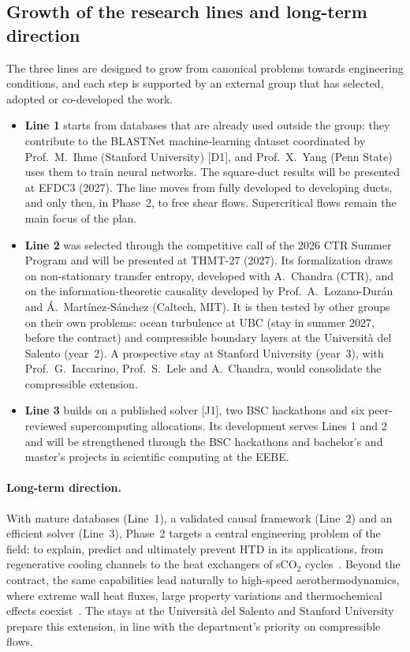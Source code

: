 \documentclass[11pt]{article}
\begin{document}
\subsection{Growth of the research lines and long-term direction}\label{sec:growth}
The three lines are designed to grow from canonical problems towards engineering conditions,
and each step is supported by an external group that has selected, adopted or co-developed
the work.
\begin{itemize}
  \item \textbf{Line 1} starts from databases that are already used outside the group: they
  contribute to the BLASTNet machine-learning dataset coordinated by Prof.\ M.\ Ihme
  (Stanford University) [D1], and Prof.\ X.\ Yang (Penn State) uses them to train neural
  networks. The square-duct results will be presented at EFDC3 (2027). The line moves from
  fully developed to developing ducts, and only then, in Phase~2, to free shear flows.
  Supercritical flows remain the main focus of the plan.
  \item \textbf{Line 2} was selected through the competitive call of the 2026 CTR Summer
  Program and will be presented at THMT-27 (2027). Its formalization draws on non-stationary
  transfer entropy, developed with A.\ Chandra (CTR), and on the information-theoretic
  causality developed by Prof.\ A.\ Lozano-Dur\'an and \'A.\ Mart\'inez-S\'anchez
  (Caltech, MIT). It is then tested by other groups on their own problems: ocean turbulence
  at UBC (stay in summer 2027, before the contract) and compressible boundary layers at the
  Universit\`a del Salento (year~2). A prospective stay at Stanford University (year~3), with
  Prof.\ G.\ Iaccarino, Prof.\ S.\ Lele and A.\ Chandra, would consolidate the compressible
  extension.
  \item \textbf{Line 3} builds on a published solver [J1], two BSC hackathons and six
  peer-reviewed supercomputing allocations. Its development serves Lines 1 and 2 and will
  be strengthened through the BSC hackathons and bachelor's and master's projects in
  scientific computing at the EEBE.
\end{itemize}

\paragraph{Long-term direction.} With mature databases (Line~1), a validated causal framework
(Line~2) and an efficient solver (Line~3), Phase~2 targets a central engineering problem of
the field: to explain, predict and ultimately prevent HTD in its applications, from
regenerative cooling channels to the heat exchangers of sCO$_2$
cycles~\cite{Pizzarelli2018,Ahn2015}. Beyond the contract, the same capabilities lead
naturally to high-speed aerothermodynamics, where extreme wall heat fluxes, large property
variations and thermochemical effects coexist~\cite{Urzay2018,DiRenzoUrzay2021,Passiatore2022}.
The stays at the Universit\`a del Salento and Stanford University prepare this extension, in
line with the department's priority on compressible flows.
\end{document}
